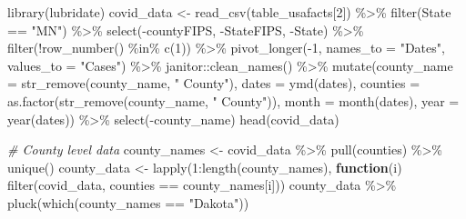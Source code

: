 \documentclass[
]{book}
\newenvironment{Shaded}{\begin{snugshade}}{\end{snugshade}}
\newcommand{\AttributeTok}[1]{\textcolor[rgb]{0.77,0.63,0.00}{#1}}
\newcommand{\CommentTok}[1]{\textcolor[rgb]{0.56,0.35,0.01}{\textit{#1}}}
\newcommand{\ControlFlowTok}[1]{\textcolor[rgb]{0.13,0.29,0.53}{\textbf{#1}}}
\newcommand{\DecValTok}[1]{\textcolor[rgb]{0.00,0.00,0.81}{#1}}
\newcommand{\FunctionTok}[1]{\textcolor[rgb]{0.00,0.00,0.00}{#1}}
\newcommand{\NormalTok}[1]{#1}
\newcommand{\OtherTok}[1]{\textcolor[rgb]{0.56,0.35,0.01}{#1}}
\newcommand{\SpecialCharTok}[1]{\textcolor[rgb]{0.00,0.00,0.00}{#1}}
\newcommand{\StringTok}[1]{\textcolor[rgb]{0.31,0.60,0.02}{#1}}
\begin{document}
\begin{Shaded}
\begin{Highlighting}[]
\FunctionTok{library}\NormalTok{(lubridate)}
\NormalTok{covid\_data }\OtherTok{\textless{}{-}} \FunctionTok{read\_csv}\NormalTok{(table\_usafacts[}\DecValTok{2}\NormalTok{]) }\SpecialCharTok{\%\textgreater{}\%} \FunctionTok{filter}\NormalTok{(State }\SpecialCharTok{==} \StringTok{"MN"}\NormalTok{) }\SpecialCharTok{\%\textgreater{}\%} 
  \FunctionTok{select}\NormalTok{(}\SpecialCharTok{{-}}\NormalTok{countyFIPS, }\SpecialCharTok{{-}}\NormalTok{StateFIPS, }\SpecialCharTok{{-}}\NormalTok{State) }\SpecialCharTok{\%\textgreater{}\%} 
  \FunctionTok{filter}\NormalTok{(}\SpecialCharTok{!}\FunctionTok{row\_number}\NormalTok{() }\SpecialCharTok{\%in\%} \FunctionTok{c}\NormalTok{(}\DecValTok{1}\NormalTok{)) }\SpecialCharTok{\%\textgreater{}\%} 
  \FunctionTok{pivot\_longer}\NormalTok{(}\SpecialCharTok{{-}}\DecValTok{1}\NormalTok{, }\AttributeTok{names\_to =} \StringTok{"Dates"}\NormalTok{, }\AttributeTok{values\_to =} \StringTok{"Cases"}\NormalTok{) }\SpecialCharTok{\%\textgreater{}\%} 
\NormalTok{  janitor}\SpecialCharTok{::}\FunctionTok{clean\_names}\NormalTok{() }\SpecialCharTok{\%\textgreater{}\%} 
  \FunctionTok{mutate}\NormalTok{(}\AttributeTok{county\_name =} \FunctionTok{str\_remove}\NormalTok{(county\_name, }\StringTok{" County"}\NormalTok{), }
         \AttributeTok{dates =} \FunctionTok{ymd}\NormalTok{(dates), }
         \AttributeTok{counties =} \FunctionTok{as.factor}\NormalTok{(}\FunctionTok{str\_remove}\NormalTok{(county\_name, }\StringTok{" County"}\NormalTok{)), }
         \AttributeTok{month =} \FunctionTok{month}\NormalTok{(dates), }
         \AttributeTok{year =} \FunctionTok{year}\NormalTok{(dates)) }\SpecialCharTok{\%\textgreater{}\%}
  \FunctionTok{select}\NormalTok{(}\SpecialCharTok{{-}}\NormalTok{county\_name)}
\FunctionTok{head}\NormalTok{(covid\_data)}
\end{Highlighting}
\end{Shaded}

\begin{Shaded}
\begin{Highlighting}[]
\CommentTok{\# County level data}
\NormalTok{county\_names }\OtherTok{\textless{}{-}}\NormalTok{ covid\_data }\SpecialCharTok{\%\textgreater{}\%} \FunctionTok{pull}\NormalTok{(counties) }\SpecialCharTok{\%\textgreater{}\%} \FunctionTok{unique}\NormalTok{()}
\NormalTok{county\_data }\OtherTok{\textless{}{-}} \FunctionTok{lapply}\NormalTok{(}\DecValTok{1}\SpecialCharTok{:}\FunctionTok{length}\NormalTok{(county\_names), }\ControlFlowTok{function}\NormalTok{(i) }\FunctionTok{filter}\NormalTok{(covid\_data, counties }\SpecialCharTok{==}\NormalTok{ county\_names[i]))}
\NormalTok{county\_data }\SpecialCharTok{\%\textgreater{}\%} \FunctionTok{pluck}\NormalTok{(}\FunctionTok{which}\NormalTok{(county\_names }\SpecialCharTok{==} \StringTok{"Dakota"}\NormalTok{))}
\end{Highlighting}
\end{Shaded}
\end{document}
